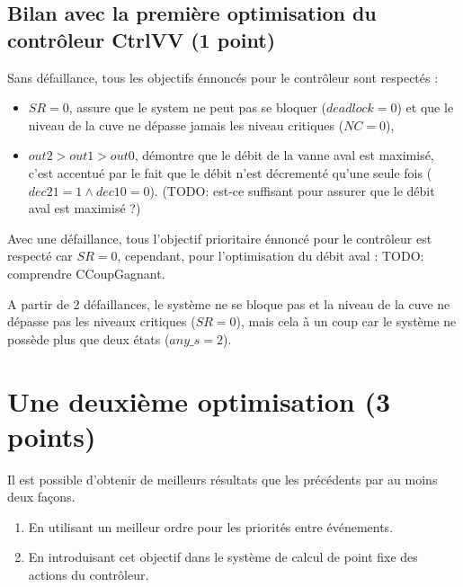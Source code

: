 \documentclass[a4paper]{book}
\begin{document}
\subsection{Bilan avec la première optimisation du contrôleur CtrlVV (1 point)}

Sans défaillance, tous les objectifs énnoncés pour le contrôleur sont respectés :
\begin{itemize}
  \item $SR = 0$, assure que le system ne peut pas se bloquer ($deadlock = 0$)
    et que le niveau de la cuve ne dépasse jamais les niveau critiques ($NC =
    0$),
  \item $out2 > out1 > out0$, démontre que le débit de la vanne aval est
    maximisé, c'est accentué par le fait que le débit n'est décrementé qu'une
    seule fois ($dec21 = 1 \wedge dec10 = 0$).
    (TODO: est-ce suffisant pour assurer que le débit aval est maximisé ?)
\end{itemize}


Avec une défaillance, tous l'objectif prioritaire énnoncé pour le contrôleur est respecté car $SR = 0$, cependant,
pour l'optimisation du débit aval : TODO: comprendre CCoupGagnant.

A partir de 2 défaillances, le système ne se bloque pas et la niveau de la cuve
ne dépasse pas les niveaux critiques ($SR = 0$), mais cela à un coup car le
système ne possède plus que deux états ($any\_s = 2$).


\section{Une deuxième optimisation (3 points)}
Il est possible d'obtenir de meilleurs résultats que les précédents par au moins deux façons.
\begin{enumerate}
\item En utilisant un meilleur ordre pour les priorités entre événements.
\item En introduisant cet objectif dans le système de calcul de point fixe des actions du contrôleur.
\end{enumerate}
\end{document}
